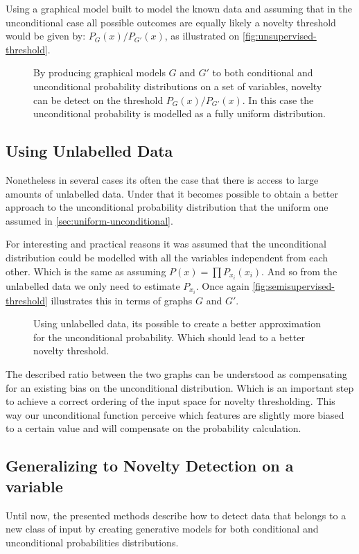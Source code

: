 \documentclass[runningheads,a4paper]{llncs}
\begin{document}
Using a graphical model built to model the known data and assuming that in the unconditional case all possible outcomes
are equally likely a novelty threshold would be given by: $P_G(x)/P_{G'}(x)$, as illustrated on \autoref{fig:unsupervised-threshold}.

\begin{figure}[h]
\caption{\label{fig:unsupervised-threshold}By producing graphical models $G$ and $G'$ to both conditional and unconditional probability
         distributions on a set of variables, novelty can be detect on the threshold $P_G(x)/P_{G'}(x)$.
         In this case the unconditional probability is modelled as a fully uniform distribution.}
\end{figure}


\subsection{Using Unlabelled Data}
Nonetheless in several cases its often the case that there is access to large amounts of unlabelled data.
Under that it becomes possible to obtain a better approach to the unconditional probability distribution that
the uniform one assumed in \autoref{sec:uniform-unconditional}.

For interesting and practical reasons it was assumed that the unconditional distribution could be modelled with
all the variables independent from each other.
Which is the same as assuming $P(x)=\prod{P_{x_i}(x_i)}$.
And so from the unlabelled data we only need to estimate $P_{x_i}$.
Once again \autoref{fig:semisupervised-threshold} illustrates this in terms of graphs $G$ and $G'$.

\begin{figure}[h]
\caption{\label{fig:semisupervised-threshold}Using unlabelled data, its possible to create a better approximation
         for the unconditional probability. Which should lead to a better novelty threshold.}
\end{figure}

The described ratio between the two graphs can be understood as compensating for an existing bias
on the unconditional distribution.
Which is an important step to achieve a correct ordering of the input space for novelty thresholding.
This way our unconditional function perceive which features are slightly more biased to a certain value and will
compensate on the probability calculation.

\subsection{Generalizing to Novelty Detection on a variable}
Until now, the presented methods describe how to detect data that belongs to a new class of input by creating
generative models for both conditional and unconditional probabilities distributions.
\end{document}
